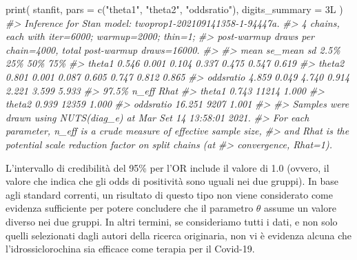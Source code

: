 \documentclass[
]{memoir}
\newenvironment{Shaded}{\begin{snugshade}}{\end{snugshade}}
\newcommand{\AttributeTok}[1]{\textcolor[rgb]{0.77,0.63,0.00}{#1}}
\newcommand{\CommentTok}[1]{\textcolor[rgb]{0.56,0.35,0.01}{\textit{#1}}}
\newcommand{\FunctionTok}[1]{\textcolor[rgb]{0.00,0.00,0.00}{#1}}
\newcommand{\NormalTok}[1]{#1}
\newcommand{\OtherTok}[1]{\textcolor[rgb]{0.56,0.35,0.01}{#1}}
\newcommand{\SpecialCharTok}[1]{\textcolor[rgb]{0.00,0.00,0.00}{#1}}
\newcommand{\StringTok}[1]{\textcolor[rgb]{0.31,0.60,0.02}{#1}}
\begin{document}
\begin{Shaded}
\end{Shaded}

\begin{Shaded}
\begin{Highlighting}[]
\FunctionTok{print}\NormalTok{(}
\NormalTok{  stanfit,}
  \AttributeTok{pars =} \FunctionTok{c}\NormalTok{(}\StringTok{"theta1"}\NormalTok{, }\StringTok{"theta2"}\NormalTok{, }\StringTok{"oddsratio"}\NormalTok{),}
  \AttributeTok{digits\_summary =}\NormalTok{ 3L}
\NormalTok{)}
\CommentTok{\#\textgreater{} Inference for Stan model: twoprop1{-}202109141358{-}1{-}94447a.}
\CommentTok{\#\textgreater{} 4 chains, each with iter=6000; warmup=2000; thin=1; }
\CommentTok{\#\textgreater{} post{-}warmup draws per chain=4000, total post{-}warmup draws=16000.}
\CommentTok{\#\textgreater{} }
\CommentTok{\#\textgreater{}            mean se\_mean    sd  2.5\%   25\%   50\%   75\%}
\CommentTok{\#\textgreater{} theta1    0.546   0.001 0.104 0.337 0.475 0.547 0.619}
\CommentTok{\#\textgreater{} theta2    0.801   0.001 0.087 0.605 0.747 0.812 0.865}
\CommentTok{\#\textgreater{} oddsratio 4.859   0.049 4.740 0.914 2.221 3.599 5.933}
\CommentTok{\#\textgreater{}            97.5\% n\_eff  Rhat}
\CommentTok{\#\textgreater{} theta1     0.743 11214 1.000}
\CommentTok{\#\textgreater{} theta2     0.939 12359 1.000}
\CommentTok{\#\textgreater{} oddsratio 16.251  9207 1.001}
\CommentTok{\#\textgreater{} }
\CommentTok{\#\textgreater{} Samples were drawn using NUTS(diag\_e) at Mar Set 14 13:58:01 2021.}
\CommentTok{\#\textgreater{} For each parameter, n\_eff is a crude measure of effective sample size,}
\CommentTok{\#\textgreater{} and Rhat is the potential scale reduction factor on split chains (at }
\CommentTok{\#\textgreater{} convergence, Rhat=1).}
\end{Highlighting}
\end{Shaded}

L'intervallo di credibilità del 95\% per l'OR include il valore di 1.0 (ovvero, il valore che indica che gli odds di positività sono uguali nei due gruppi). In base agli standard correnti, un risultato di questo tipo non viene considerato come evidenza sufficiente per potere concludere che il parametro \(\theta\) assume un valore diverso nei due gruppi. In altri termini, se consideriamo tutti i dati, e non solo quelli selezionati dagli autori della ricerca originaria, non vi è evidenza alcuna che l'idrossiclorochina sia efficace come terapia per il Covid-19.
\end{document}
